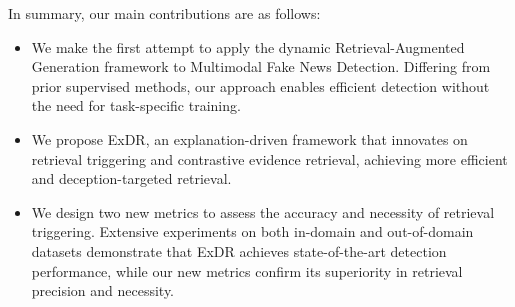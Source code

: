 In summary, our main contributions are as follows:

\begin{itemize}
     

\item We make the first attempt to apply the dynamic Retrieval-Augmented Generation framework to Multimodal Fake News Detection. Differing from prior supervised methods, our approach enables efficient detection without the need for task-specific training.
\item We propose ExDR, an explanation-driven framework that innovates on retrieval triggering and contrastive evidence retrieval, achieving more efficient and deception-targeted retrieval.

\item We design two new metrics to assess the accuracy and necessity of retrieval triggering. Extensive experiments on both in-domain and out-of-domain datasets demonstrate that ExDR achieves state-of-the-art detection performance, while our new metrics confirm its superiority in retrieval precision and necessity.
\end{itemize}